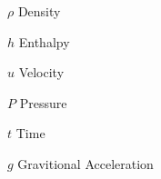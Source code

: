 \begin{eqlist}

\item[$\rho$] Density
\item[$h$] Enthalpy
\item[$u$] Velocity
\item[$P$] Pressure
\item[$t$] Time
\item[$g$] Gravitional Acceleration

\end{eqlist}